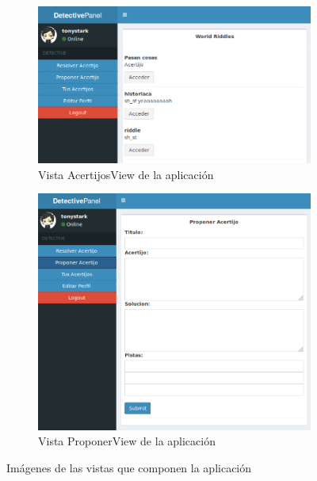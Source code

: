 \begin{figure}[hbtp] \centering
\begin{subfigure}{.8\textwidth}
    \includegraphics[width=\linewidth]{figuras/riddling.png}
    \caption{Vista AcertijosView de la aplicación}
    \label{fig::acertijosview}
\end{subfigure}
\begin{subfigure}{.8\textwidth}
    \includegraphics[width=\linewidth]{figuras/proponerview.png}
    \caption{Vista ProponerView de la aplicación}
    \label{fig::proponerview}
\end{subfigure}
\caption{Imágenes de las vistas que componen la aplicación}
\end{figure}

